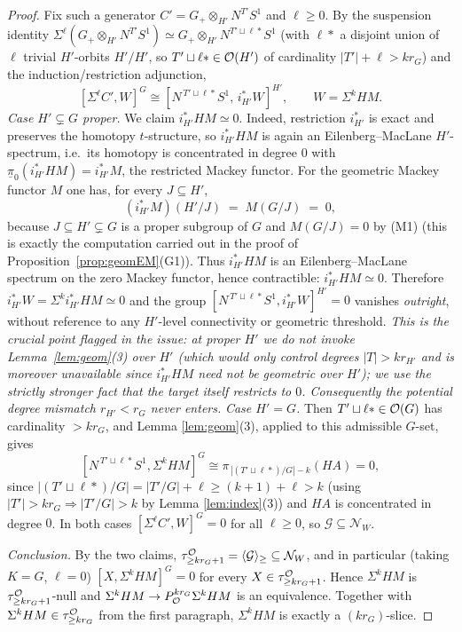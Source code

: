 \begin{proof}
Fix such a generator $C'=G_+\otimes_{H'}N^{T'}S^1$ and $\ell\ge0$. By the
suspension identity $\Sigma^\ell(G_+\otimes_{H'}N^{T'}S^1)\simeq
G_+\otimes_{H'}N^{T'\sqcup\ell\ast}S^1$ (with $\ell\ast$ a disjoint union of $\ell$ trivial $H'$-orbits $H'/H'$, so
$T'\sqcup\ell\ast\in\mathcal{O}(H')$ of cardinality $|T'|+\ell>kr_G$) and the
induction/restriction adjunction,
\[
[\Sigma^\ell C',W]^G\cong[N^{\,T'\sqcup\ell\ast}S^1,\,i_{H'}^\ast W]^{H'},
\qquad W=\Sigma^kHM.
\]
\emph{Case $H'\subsetneq G$ proper.} We claim $i_{H'}^\ast HM\simeq 0$.
Indeed, restriction $i_{H'}^\ast$ is exact and preserves the homotopy
$t$-structure, so $i_{H'}^\ast HM$ is again an Eilenberg--MacLane $H'$-spectrum,
i.e.\ its homotopy is concentrated in degree $0$ with
$\underline\pi_0(i_{H'}^\ast HM)=i_{H'}^\ast M$, the restricted Mackey functor.
For the geometric Mackey functor $M$ one has, for every $J\subseteq H'$,
\[
(i_{H'}^\ast M)(H'/J)\;=\;M(G/J)\;=\;0,
\]
because $J\subseteq H'\subsetneq G$ is a proper subgroup of $G$ and $M(G/J)=0$ by
(M1) (this is exactly the computation carried out in the proof of
Proposition~\ref{prop:geomEM}(G1)). Thus $i_{H'}^\ast HM$ is an
Eilenberg--MacLane spectrum on the zero Mackey functor, hence contractible:
$i_{H'}^\ast HM\simeq 0$. Therefore
$i_{H'}^\ast W=\Sigma^k i_{H'}^\ast HM\simeq 0$ and the group
$[N^{\,T'\sqcup\ell\ast}S^1,i_{H'}^\ast W]^{H'}=0$ vanishes \emph{outright},
without reference to any $H'$-level connectivity or geometric threshold.
\emph{This is the crucial point flagged in the issue: at proper $H'$ we do not
invoke Lemma~\ref{lem:geom}(3) over $H'$ (which would only control degrees
$|T|>kr_{H'}$ and is moreover unavailable since $i_{H'}^\ast HM$ need not be
geometric over $H'$); we use the strictly stronger fact that the target itself
restricts to $0$. Consequently the potential degree mismatch $r_{H'}<r_G$ never
enters.} \emph{Case $H'=G$.} Then $T'\sqcup\ell\ast\in\mathcal{O}(G)$ has cardinality
$>kr_G$, and Lemma \ref{lem:geom}(3), applied to this admissible $G$-set, gives
\[
[N^{\,T'\sqcup\ell\ast}S^1,\Sigma^kHM]^G\cong
\pi_{\,|(T'\sqcup\ell\ast)/G|-k}(HA)=0,
\]
since $|(T'\sqcup\ell\ast)/G|=|T'/G|+\ell\ge(k+1)+\ell>k$ (using $|T'|>kr_G
\Rightarrow|T'/G|>k$ by Lemma \ref{lem:index}(3)) and $HA$ is concentrated in
degree $0$. In both cases $[\Sigma^\ell C',W]^G=0$ for all $\ell\ge0$, so
$\mathcal G\subseteq\mathcal N_W$.

\emph{Conclusion.} By the two claims,
$\tau^{\mathcal{O}}_{\ge kr_G+1}=\langle\mathcal G\rangle_{\ge}\subseteq\mathcal N_W$, and
in particular (taking $K=G$, $\ell=0$) $[X,\Sigma^kHM]^G=0$ for every
$X\in\tau^{\mathcal{O}}_{\ge kr_G+1}$. Hence $\Sigma^kHM$ is $\tau^{\mathcal{O}}_{\ge kr_G+1}$-null
and $\Sigma^kHM\to P^{kr_G}_{\mathcal{O}}\Sigma^kHM$ is an equivalence. Together with
$\Sigma^kHM\in\tau^{\mathcal{O}}_{\ge kr_G}$ from the first paragraph, $\Sigma^k HM$ is
exactly a $(k r_G)$-slice.
\end{proof}

